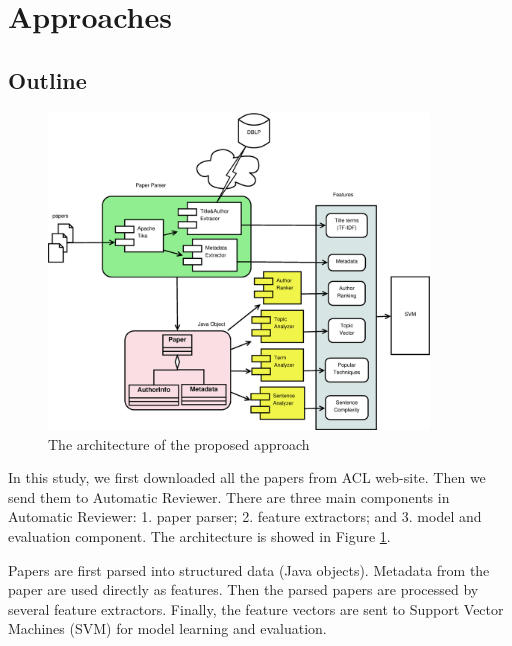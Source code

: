 \documentclass[11pt,letterpaper]{article}
\begin{document}
\section{Approaches}
\subsection{Outline}

\begin{figure}[htb]
  \centering
	 	 \includegraphics[width=0.9\textwidth]{materials/architecture.eps}
		\caption{The architecture of the proposed approach}
		\label{fig:architecture}
\end{figure}
In this study, we first downloaded all the papers from ACL web-site. Then we send them to Automatic Reviewer. There are three main components in Automatic Reviewer: 1. paper parser; 2. feature extractors; and 3. model and evaluation component. 
The architecture is showed in Figure \ref{fig:architecture}.

Papers are first parsed into structured data (Java objects). Metadata from the paper are used directly as features. Then the parsed papers are processed by several feature extractors. Finally, the feature vectors are sent to Support Vector Machines (SVM) for model learning and evaluation.
\end{document}
